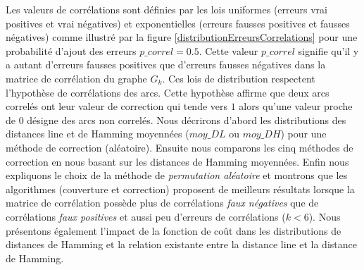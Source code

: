 Les valeurs de corr\'elations sont d\'efinies par les lois uniformes (erreurs vrai positives et vrai n\'egatives) et exponentielles (erreurs fausses positives et fausses n\'egatives) comme illustr\'e par la figure \ref{distributionErreursCorrelations} pour une probabilit\'e d'ajout des erreurs $p\_correl = 0.5$. 
Cette valeur $p\_correl$  signifie qu'il y a autant d'erreurs fausses positives que d'erreurs fausses n\'egatives dans la matrice de corr\'elation du graphe $G_{k}$. 
Ces lois de distribution respectent l'hypoth\`ese de corr\'elations des arcs. Cette hypoth\`ese affirme que deux arcs correl\'es ont leur valeur de correction qui tende vers $1$ alors qu'une valeur proche de $0$ d\'esigne des arcs non correl\'es. 
\newline
Nous d\'ecrirons d'abord les distributions des distances line et de Hamming moyenn\'ees ($moy\_DL$ ou $moy\_DH$) pour une m\'ethode de correction (al\'eatoire). Ensuite nous comparons les cinq m\'ethodes de correction en nous basant sur les distances de Hamming moyenn\'ees. 
Enfin nous expliquons le choix de la m\'ethode de {\em permutation al\'eatoire} et montrons que les algorithmes (couverture et correction) proposent de meilleurs r\'esultats lorsque la matrice de corr\'elation poss\`ede plus de corr\'elations {\em faux n\'egatives} que de corr\'elations {\em faux positives} et aussi peu d'erreurs de corr\'elations ($k < 6$). 
\newline
Nous pr\'esentons \'egalement l'impact de la fonction de co\^ut dans les distributions  de distances de Hamming et 
la relation existante entre la distance line et la distance de Hamming.